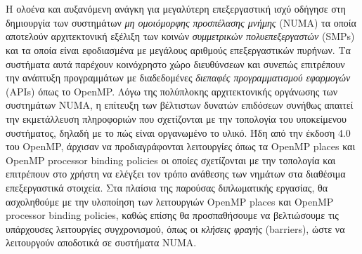 \chapter*{\abstractname}
\addstarredchapter{\abstractname} %
\makecseabstract


\noindent Η ολοένα και αυξανόμενη ανάγκη για μεγαλύτερη επεξεργαστική ισχύ οδήγησε στη δημιουργία των συστημάτων \textit{μη ομοιόμορφης προσπέλασης μνήμης} (NUMA) τα οποία αποτελούν αρχιτεκτονική εξέλιξη των κοινών \textit{συμμετρικών πολυεπεξεργαστών} (SMPs) και τα οποία είναι εφοδιασμένα με μεγάλους αριθμούς επεξεργαστικών πυρήνων. Τα συστήματα αυτά παρέχουν κοινόχρηστο χώρο διευθύνσεων και συνεπώς επιτρέπουν την ανάπτυξη προγραμμάτων με διαδεδομένες \textit{διεπαφές προγραμματισμού εφαρμογών} (APIs) όπως το OpenMP. Λόγω της πολύπλοκης αρχιτεκτονικής οργάνωσης των συστημάτων NUMA, η επίτευξη των βέλτιστων δυνατών επιδόσεων συνήθως απαιτεί την εκμετάλλευση πληροφοριών που σχετίζονται με την τοπολογία του υποκείμενου συστήματος, δηλαδή με το πώς είναι οργανωμένο το υλικό. Ήδη από την έκδοση 4.0 του OpenMP, άρχισαν να προδιαγράφονται λειτουργίες όπως τα OpenMP places και OpenMP processor binding policies οι οποίες σχετίζονται με την τοπολογία και επιτρέπουν στο χρήστη να ελέγξει τον τρόπο ανάθεσης των νημάτων στα διαθέσιμα επεξεργαστικά στοιχεία. Στα πλαίσια της παρούσας διπλωματικής εργασίας, θα ασχοληθούμε με την υλοποίηση των λειτουργιών OpenMP places και OpenMP processor binding policies, καθώς επίσης θα προσπαθήσουμε να βελτιώσουμε τις υπάρχουσες λειτουργίες συγχρονισμού, όπως οι \textit{κλήσεις φραγής} (barriers), ώστε να λειτουργούν αποδοτικά σε συστήματα NUMA.


\bigskip